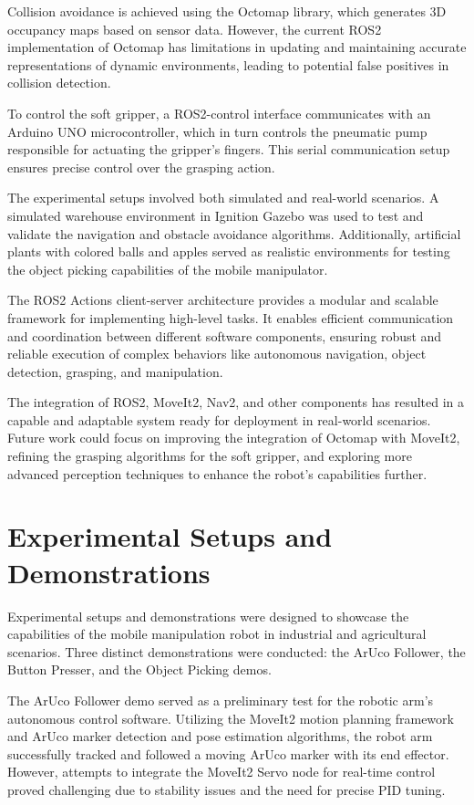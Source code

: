 Collision avoidance is achieved using the Octomap library, which generates 3D occupancy maps based on sensor data. 
However, the current ROS2 implementation of Octomap has limitations in updating and maintaining accurate 
representations of dynamic environments, leading to potential false positives in collision detection.

To control the soft gripper, a ROS2-control interface communicates with an Arduino UNO microcontroller, 
which in turn controls the pneumatic pump responsible for actuating the gripper's fingers. 
This serial communication setup ensures precise control over the grasping action.

The experimental setups involved both simulated and real-world scenarios. A simulated warehouse environment
in Ignition Gazebo was used to test and validate the navigation and obstacle avoidance algorithms. 
Additionally, artificial plants with colored balls and apples served as realistic environments for testing
the object picking capabilities of the mobile manipulator.

The ROS2 Actions client-server architecture provides a modular and scalable framework for implementing high-level tasks.
It enables efficient communication and coordination between different software components, 
ensuring robust and reliable execution of complex behaviors like autonomous navigation, object detection, grasping,
and manipulation.

The integration of ROS2, MoveIt2, Nav2, and other components 
has resulted in a capable and adaptable system ready for deployment in real-world scenarios. Future work could focus
on improving the integration of Octomap with MoveIt2, refining the grasping algorithms for the soft gripper, 
and exploring more advanced perception techniques to enhance the robot's capabilities further.

\section{Experimental Setups and Demonstrations}

Experimental setups and demonstrations were designed to showcase the capabilities of the 
mobile manipulation robot in industrial and agricultural scenarios. Three distinct demonstrations were conducted:
the ArUco Follower, the Button Presser, and the Object Picking demos.

The ArUco Follower demo served as a preliminary test for the robotic arm's autonomous control software. 
Utilizing the MoveIt2 motion planning framework and ArUco marker detection and pose estimation algorithms, 
the robot arm successfully tracked and followed a moving ArUco marker with its end effector. However, 
attempts to integrate the MoveIt2 Servo node for real-time control proved challenging due to stability issues
and the need for precise PID tuning.

